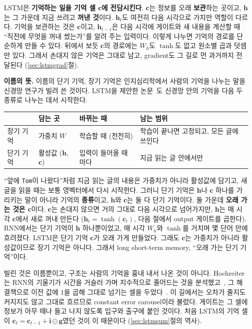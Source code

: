 \documentclass[11pt,a4paper]{article}
\newcommand{\vect}[1]{\bm{#1}}
\newcommand{\w}[1]{\texttt{#1}}
\begin{document}
LSTM은 \textbf{기억하는 일을 기억 셀 $\vect c$에 전담시킨다}. $\vect c$는 정보를 오래 \textbf{보관}하는 곳이고, $\vect h$는 그 가운데 지금 쓰려고 \textbf{꺼낸 것}이다.
$\vect h_t$도 여전히 다음 시각으로 가지만 역할이 다르다. 기억을 보관하는 것은 $\vect c$이고, $\vect h_{t-1}$은 다음 시각에 게이트와 새 내용을 계산할 때 ``직전에 무엇을 꺼내 썼는가''를 알려 주는 입력이다.
이렇게 나누면 기억의 경로를 단순하게 만들 수 있다. 뒤에서 보듯 $\vect c$의 경로에는 $W_h$도 $\tanh$도 없고 원소별 곱과 덧셈만 있다.
그래서 손대지 않은 기억은 그대로 남고, gradient도 그 길로 먼 과거까지 전달된다 (\ref{sec:lstmgrad}절).

\textbf{이름의 뜻.} 이름의 단기 기억, 장기 기억은 인지심리학에서 사람의 기억을 나누는 말을 신경망 연구가 빌려 쓴 것이다.
LSTM을 제안한 논문~\cite{hochreiter1997}도 신경망 안의 기억을 다음 두 종류로 나누는 데서 시작한다.

\begin{center}
\begin{tabular}{@{}llll@{}}
\toprule
& 담는 곳 & 바뀌는 때 & 남는 범위 \\
\midrule
장기 기억 & 가중치 $W$ & 학습할 때 (천천히) & 학습이 끝나면 고정되고, 모든 글에 쓰인다 \\
단기 기억 & 활성값 ($\vect h$, $\vect c$) & 입력이 들어올 때마다 & 지금 읽는 글 안에서만 \\
\bottomrule
\end{tabular}
\end{center}

``앞에 \w{Tom}이 나왔다''처럼 지금 읽는 글의 내용은 가중치가 아니라 활성값에 담기고, 새 글을 읽을 때는 보통 영벡터에서 다시 시작한다.
그러니 단기 기억은 $\vect h$나 $\vect c$ 하나를 가리키는 말이 아니라 기억의 \textbf{종류}이고, $\vect h$와 $\vect c$는 둘 다 단기 기억이다.
둘 가운데 \textbf{오래 가는 것은 $\vect c$}이다. $\vect c$는 손대지 않으면 거의 그대로 다음 시각으로 넘어가지만, $\vect h$는 매 시각 $\vect c$에서 새로 꺼내 만든다 ($\vect h_t=\tanh(\vect c_t)$, 다음 절에서 output 게이트를 곱한다).
RNN에서는 단기 기억이 $\vect h$ 하나뿐이었고, 매 시각 $W_h$와 $\tanh$를 거치며 몇 단어 만에 흐려졌다.
LSTM은 단기 기억 $\vect c$가 오래 가게 만들었다. 그래도 $\vect c$는 가중치가 아니라 활성값이므로 장기 기억은 아니다.
그래서 long short-term memory, ``오래 가는 단기 기억''이다.

빌린 것은 이름뿐이고, 구조는 사람의 기억을 흉내 내서 나온 것이 아니다.
Hochreiter는 RNN의 기울기가 시간을 거슬러 가며 지수적으로 줄어드는 것을 분석했고~\cite{hochreiter1991}, 그 해결책으로 이전 값에 $1$을 곱해 그대로 넘기는 셀을 두었다~\cite{hochreiter1997}.
이 길에서는 오차가 줄지도 커지지도 않고 그대로 흐르므로 constant error carousel이라 불렀다. 게이트는 그 셀에 정보가 아무 때나 들고 나지 않도록 입구와 출구에 붙인 것이다.
처음 LSTM의 기억 셀이 $\vect c_t=\vect c_{t-1}+\vect i\odot\vect g$였던 것이 이 때문이다 (\ref{sec:lstmsum}절의 역사).
\end{document}

